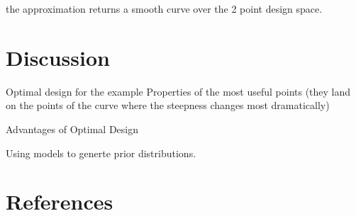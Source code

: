 \documentclass[preprint,review,12pt]{elsarticle}
\begin{document}
the approximation returns a smooth curve over the 2 point design space.

\section{Discussion}
\label{S:4}

Optimal design for the example
Properties of the most useful points (they land on the points of the curve where the steepness changes most dramatically)

Advantages of Optimal Design

Using models to generte prior distributions.





\section*{References}



\end{document}
